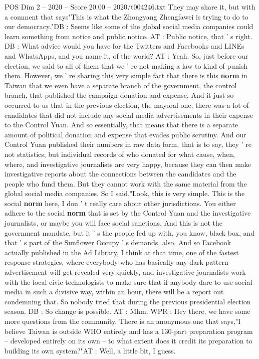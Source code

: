 \begin{textsample}{POS Dim 2 – 2020 – Score 20.00 – 2020/t004246.txt}
They may share it, but with a comment that says"This is what the Zhongyang Zhengfawei is trying to do to our democracy."DB : Seems like some of the global social media companies could learn something from notice and public notice.
AT : Public notice, that ' s right.
DB : What advice would you have for the Twitters and Facebooks and LINEs and WhatsApps, and you name it, of the world?
AT : Yeah.
So, just before our election, we said to all of them that we ' re not making a law to kind of punish them.
However, we ' re sharing this very simple fact that there is this \textbf{norm} in Taiwan that we even have a separate branch of the government, the control branch, that published the campaign donation and expense.
And it just so occurred to us that in the previous election, the mayoral one, there was a lot of candidates that did not include any social media advertisements in their expense to the Control Yuan.
And so essentially, that means that there is a separate amount of political donation and expense that evades public scrutiny.
And our Control Yuan published their numbers in raw data form, that is to say, they ' re not statistics, but individual records of who donated for what cause, when, where, and investigative journalists are very happy, because they can then make investigative reports about the connections between the candidates and the people who fund them.
But they cannot work with the same material from the global social media companies.
So I said,"Look, this is very simple.
This is the social \textbf{norm} here, I don ' t really care about other jurisdictions.
You either adhere to the social \textbf{norm} that is set by the Control Yuan and the investigative journalists, or maybe you will face social sanctions.
And this is not the government mandate, but it ' s the people fed up with, you know, black box, and that ' s part of the Sunflower Occupy ' s demands, also.
And so Facebook actually published in the Ad Library, I think at that time, one of the fastest response strategies, where everybody who has basically any dark pattern advertisement will get revealed very quickly, and investigative journalists work with the local civic technologists to make sure that if anybody dare to use social media in such a divisive way, within an hour, there will be a report out condemning that.
So nobody tried that during the previous presidential election season.
DB : So change is possible.
AT : Mhm.
WPR : Hey there, we have some more questions from the community.
There is an anonymous one that says,"I believe Taiwan is outside WHO entirely and has a 130-part preparation program -- developed entirely on its own -- to what extent does it credit its preparation to building its own system?"AT : Well, a little bit, I guess.

\end{textsample}
